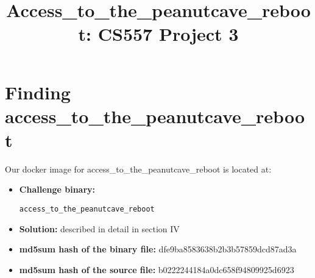 \documentclass[10pt, conference, letterpaper]{IEEEtran}
\begin{document}
\graphicspath{ {images/} }
\newcommand{\sysname}{ModiPick\xspace}
\newcommand{\Brittany}[1]{{\color{red}\textbf{Brittany: \textit{#1}}}}
\newcommand{\sam}[1]{{\color{blue}\textbf{Sam: \textit{#1}}}}
\newcommand{\eat}[1]{}



\title{Access\_to\_the\_peanutcave\_reboot: CS557 Project 3
}

\author{
\and
{}
}



\maketitle

\begin{abstract}

\end{abstract}

\section{Finding access\_to\_the\_peanutcave\_reboot}
Our docker image for access\_to\_the\_peanutcave\_reboot is located at:

\begin{itemize}
  \item \textbf{Challenge binary:}

{\tt access\_to\_the\_peanutcave\_reboot}
  \item \textbf{Solution:} described in detail in section IV
  \item \textbf{md5sum hash of the binary file:} dfe9ba8583638b2b3b57859dcd87ad3a
  \item \textbf{md5sum hash of the source file:} b0222244184a0dc658f94809925d6923
\end{itemize}











%
%
\end{document}

